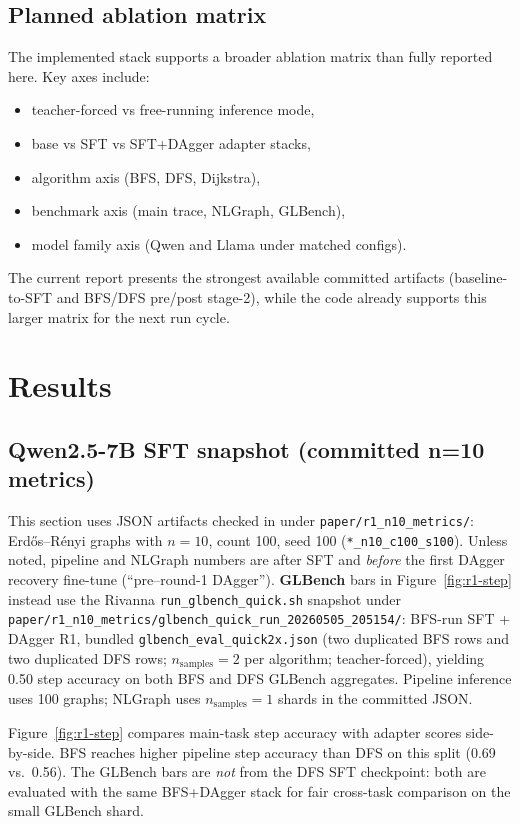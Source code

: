 \documentclass[sigplan,screen]{acmart}
\begin{document}
\subsection{Planned ablation matrix}
The implemented stack supports a broader ablation matrix than fully reported here.
Key axes include:
\begin{itemize}
  \item teacher-forced vs free-running inference mode,
  \item base vs SFT vs SFT+DAgger adapter stacks,
  \item algorithm axis (BFS, DFS, Dijkstra),
  \item benchmark axis (main trace, NLGraph, GLBench),
  \item model family axis (Qwen and Llama under matched configs).
\end{itemize}
The current report presents the strongest available committed artifacts (baseline-to-SFT and BFS/DFS pre/post stage-2), while the code already supports this larger matrix for the next run cycle.

\section{Results}
\subsection{Qwen2.5-7B SFT snapshot (committed n=10 metrics)}
This section uses JSON artifacts checked in under \texttt{paper/r1\_n10\_metrics/}: Erd\H{o}s--R\'enyi graphs with $n{=}10$, count 100, seed 100 (\texttt{*\_n10\_c100\_s100}).
Unless noted, pipeline and NLGraph numbers are after SFT and \emph{before} the first DAgger recovery fine-tune (``pre--round-1 DAgger'').
\textbf{GLBench} bars in Figure~\ref{fig:r1-step} instead use the Rivanna \texttt{run\_glbench\_quick.sh} snapshot under \texttt{paper/r1\_n10\_metrics/glbench\_quick\_run\_20260505\_205154/}: BFS-run SFT + DAgger R1, bundled \texttt{glbench\_eval\_quick2x.json} (two duplicated BFS rows and two duplicated DFS rows; $n_{\mathrm{samples}}{=}2$ per algorithm; teacher-forced), yielding 0.50 step accuracy on both BFS and DFS GLBench aggregates.
Pipeline inference uses 100 graphs; NLGraph uses $n_{\mathrm{samples}}{=}1$ shards in the committed JSON.

Figure~\ref{fig:r1-step} compares main-task step accuracy with adapter scores side-by-side.
BFS reaches higher pipeline step accuracy than DFS on this split (0.69 vs.\ 0.56).
The GLBench bars are \emph{not} from the DFS SFT checkpoint: both are evaluated with the same BFS+DAgger stack for fair cross-task comparison on the small GLBench shard.
\end{document}
